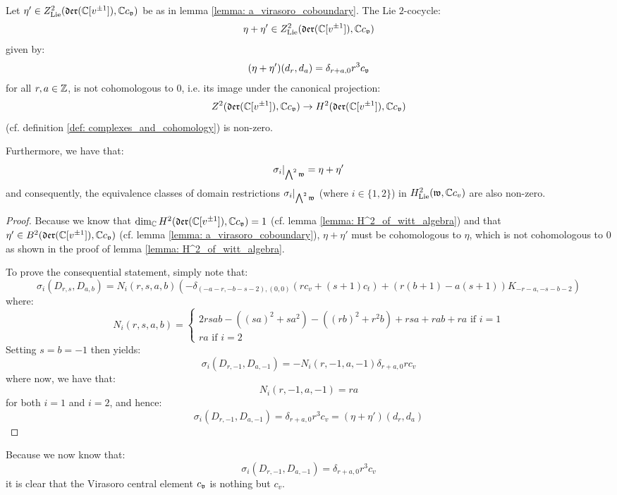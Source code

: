         \begin{lemma} \label{lemma: billig_toroidal_cocycles_on_the_witt_algebra}
            Let $\eta' \in Z^2_{\mathrm{Lie}}(\mathfrak{der}(\mathbb{C}[v^{\pm 1}]), \mathbb{C} c_{\mathfrak{v}})$ be as in lemma \ref{lemma: a_virasoro_coboundary}. The Lie $2$-cocycle:
                $$\eta + \eta' \in Z^2_{\mathrm{Lie}}(\mathfrak{der}(\mathbb{C}[v^{\pm 1}]), \mathbb{C} c_{\mathfrak{v}})$$
            given by:
                $$(\eta + \eta')(d_r, d_a) = \delta_{r + a, 0} r^3 c_{\mathfrak{v}}$$
            for all $r, a \in \mathbb{Z}$, is not cohomologous to $0$, i.e. its image under the canonical projection:
                $$Z^2(\mathfrak{der}(\mathbb{C}[v^{\pm 1}]), \mathbb{C} c_{\mathfrak{v}}) \to H^2(\mathfrak{der}(\mathbb{C}[v^{\pm 1}]), \mathbb{C} c_{\mathfrak{v}})$$
            (cf. definition \ref{def: complexes_and_cohomology}) is non-zero.

            Furthermore, we have that:
                $$\sigma_i|_{\bigwedge^2 \mathfrak{w}} = \eta + \eta'$$
            and consequently, the equivalence classes of domain restrictions $\sigma_i|_{\bigwedge^2 \mathfrak{w}}$ (where $i \in \{1, 2\}$) in $H^2_{\mathrm{Lie}}( \mathfrak{w}, \mathbb{C} c_v )$ are also non-zero.
        \end{lemma}
            \begin{proof}
                Because we know that $\dim_{\mathbb{C}} H^2(\mathfrak{der}(\mathbb{C}[v^{\pm 1}]), \mathbb{C} c_{\mathfrak{v}}) = 1$ (cf. lemma \ref{lemma: H^2_of_witt_algebra}) and that $\eta' \in B^2(\mathfrak{der}(\mathbb{C}[v^{\pm 1}]), \mathbb{C} c_{\mathfrak{v}})$ (cf. lemma \ref{lemma: a_virasoro_coboundary}), $\eta + \eta'$ must be cohomologous to $\eta$, which is not cohomologous to $0$ as shown in the proof of lemma \ref{lemma: H^2_of_witt_algebra}.

                To prove the consequential statement, simply note that:
                    $$\sigma_i(D_{r, s}, D_{a, b}) = N_i(r, s, a, b) \left( -\delta_{ (-a - r, -b - s - 2), (0, 0) } (r c_v + (s + 1) c_t) + ( r(b + 1) - a(s + 1) )K_{-r - a, -s - b - 2} \right)$$
                where:
                    $$
                        N_i(r, s, a, b) =
                        \begin{cases}
                            \text{$2 rsab - ( (sa)^2 + s a^2 ) - ( (rb)^2 + r^2 b ) + rsa + rab + ra$ if $i = 1$}
                            \\
                            \text{$ra$ if $i = 2$}
                        \end{cases}
                    $$
                Setting $s = b = -1$ then yields:
                    $$\sigma_i(D_{r, -1}, D_{a, -1}) = -N_i(r, -1, a, -1) \delta_{r + a, 0} r c_v$$
                where now, we have that:
                    $$N_i(r, -1, a, -1) = ra$$
                for both $i = 1$ and $i = 2$, and hence:
                    $$\sigma_i(D_{r, -1}, D_{a, -1}) = \delta_{r + a, 0} r^3 c_v = (\eta + \eta')(d_r, d_a)$$
            \end{proof}
        \begin{remark}
            Because we now know that:
                $$\sigma_i(D_{r, -1}, D_{a, -1}) = \delta_{r + a, 0} r^3 c_v$$
            it is clear that the Virasoro central element $c_{\mathfrak{v}}$ is nothing but $c_v$.
        \end{remark}

